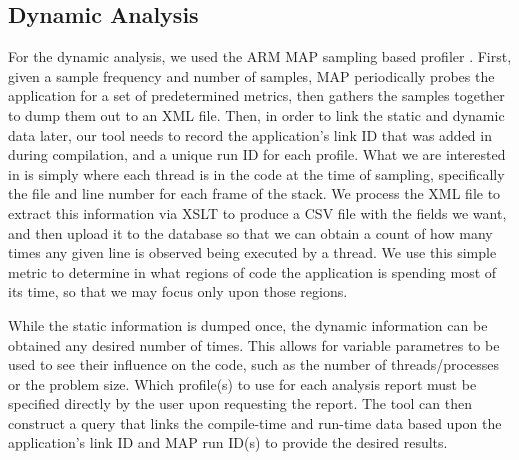 
\subsection{Dynamic Analysis}
\label{sec:dynamic}
For the dynamic analysis, we used the ARM MAP sampling based profiler \cite{arm-docs}.
First, given a sample frequency and number of samples, MAP periodically probes the application for a set of predetermined metrics, then gathers the samples together to dump them out to an \acs{XML} file.
Then, in order to link the static and dynamic data later, our tool needs to record the application's link ID that was added in during compilation, and a unique run ID for each profile.
What we are interested in is simply where each thread is in the code at the time of sampling, specifically the file and line number for each frame of the stack.
We process the \acs{XML} file to extract this information via \ac{XSLT} to produce a \acs{CSV} file with the fields we want, and then upload it to the database so that we can obtain a count of how many times any given line is observed being executed by a thread.
We use this simple metric to determine in what regions of code the application is spending most of its time, so that we may focus only upon those regions.

While the static information is dumped once, the dynamic information can be obtained any desired number of times.
This allows for variable parametres to be used to see their influence on the code, such as the number of threads/processes or the problem size.
Which profile(s) to use for each analysis report must be specified directly by the user upon requesting the report.
The tool can then construct a query that links the compile-time and run-time data based upon the application's link ID and MAP run ID(s) to provide the desired results.
